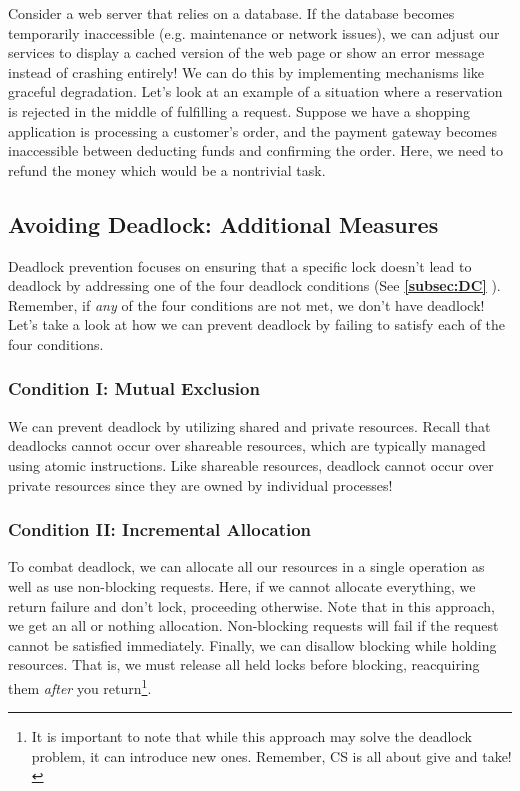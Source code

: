 \documentclass{report}
\newcommand{\exampleBegin}[1]{\begin{tcolorbox}[colback=blue!5!white,colframe=black!75!blue,title={Example:
      #1}]}
\newcommand{\exampleEnd}{\end{tcolorbox}}
\newcommand{\refto}[2]{\textbf{\ref{#1:#2} \nameref{#1:#2}}}
\begin{document}
\exampleBegin{Reservation Rejected!}
Consider a web server that relies on a database. If the database becomes temporarily inaccessible
(e.g. maintenance or network issues), we can adjust our services to display a cached version of the
web page or show an error message instead of crashing entirely! We can do this by implementing
mechanisms like graceful degradation. Let's look at an example of a situation where a reservation is
rejected in the middle of fulfilling a request. Suppose we have a shopping application is processing
a customer's order, and the payment gateway becomes inaccessible between deducting funds and
confirming the order. Here, we need to refund the money which would be a nontrivial task.
\exampleEnd


\subsection{Avoiding Deadlock: Additional Measures}
Deadlock prevention focuses on ensuring that a specific lock doesn't lead to deadlock by addressing
one of the four deadlock conditions (See \refto{subsec}{DC}). Remember, if \textit{any} of the four
conditions are not met, we don't have deadlock! Let's take a look at how we can prevent deadlock by
failing to satisfy each of the four conditions.


\subsubsection{Condition I: Mutual Exclusion}
We can prevent deadlock by utilizing shared and private resources. Recall that deadlocks cannot
occur over shareable resources, which are typically managed using atomic instructions. Like
shareable resources, deadlock cannot occur over private resources since they are owned by individual
processes!

\subsubsection{Condition II: Incremental Allocation}
To combat deadlock, we can allocate all our resources in a single operation as well as use
non-blocking requests. Here, if we cannot allocate everything, we return failure and don't
lock, proceeding otherwise. Note that in this approach, we get an all or nothing
allocation. Non-blocking requests will fail if the request cannot be satisfied immediately. Finally,
we can disallow blocking while holding resources. That is, we must release all held locks before
blocking, reacquiring them \textit{after} you return\footnote{It is important to note that while this
approach may solve the deadlock problem, it can introduce new ones. Remember, CS is all about give
and take!}.
\end{document}
